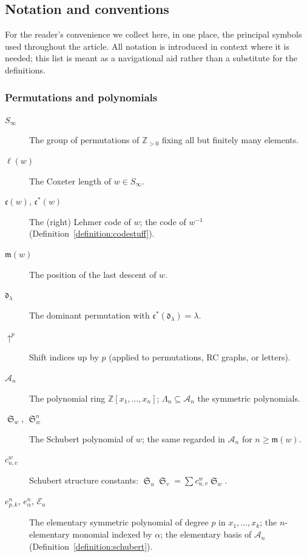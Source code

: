 \documentclass[pdflatex,sn-mathphys-num]{sn-jnl}
\numberwithin{equation}{subsection}
\DeclareMathOperator{\sch}{\mathfrak{S}}
\newcommand{\shup}{{\uparrow}}
\newcommand{\coma}{\mathcal{A}}
\newcommand{\dom}{\mathfrak{d}}
\newcommand{\code}{\mathfrak{c}}
\newcommand{\maxd}{\mathfrak{m}}
\theoremstyle{thmstyleone}
\theoremstyle{thmstylethree}
\theoremstyle{thmstyletwo}
\begin{document}
\begin{appendices}

\section{Notation and conventions}\label{section:notation}

For the reader's convenience we collect here, in one place, the principal symbols used throughout the article. All notation is introduced in context where it is needed; this list is meant as a navigational aid rather than a substitute for the definitions.

\begingroup
{}

\subsubsection*{Permutations and polynomials}
\begin{description}
\item[$S_\infty$] The group of permutations of $\mathbb{Z}_{>0}$ fixing all but finitely many elements.
\item[$\ell(w)$] The Coxeter length of $w\in S_\infty$.
\item[$\code(w)$, $\code^*(w)$] The (right) Lehmer code of $w$; the code of $w^{-1}$ (Definition~\ref{definition:codestuff}).
\item[$\maxd(w)$] The position of the last descent of $w$.
\item[$\dom_\lambda$] The dominant permutation with $\code^*(\dom_\lambda)=\lambda$.
\item[$\shup^p$] Shift indices up by $p$ (applied to permutations, RC graphs, or letters).
\item[$\coma_n$] The polynomial ring $\mathbb{Z}[x_1,\ldots,x_n]$; $\Lambda_n\subseteq\coma_n$ the symmetric polynomials.
\item[$\sch_w$, $\sch_w^n$] The Schubert polynomial of $w$; the same regarded in $\coma_n$ for $n\geq\maxd(w)$.
\item[$c_{u,v}^w$] Schubert structure constants: $\sch_u\sch_v=\sum c_{u,v}^w\sch_w$.
\item[$e_{p,k}^n$, $e_\alpha^n$, $\mathcal{E}_n$] The elementary symmetric polynomial of degree $p$ in $x_1,\ldots,x_k$; the $n$-elementary monomial indexed by $\alpha$; the elementary basis of $\coma_n$ (Definition~\ref{definition:schubert}).

\end{description}
\end{appendices}
\end{document}
